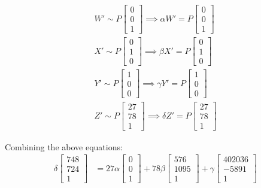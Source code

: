 \documentclass[12pt, oneside]{article}
\begin{document}
\begin{align*}
  W' \sim P
   \begin{bmatrix}
  0   \\
  0   \\
  1  
  \end{bmatrix} \implies 
  \alpha W' = P
   \begin{bmatrix}
  0   \\
  0   \\
  1  
  \end{bmatrix}   \\
  X' \sim P
   \begin{bmatrix}
  0   \\
  1   \\
  0  
  \end{bmatrix} \implies 
  \beta X' = P
   \begin{bmatrix}
  0   \\
  1   \\
  0  
  \end{bmatrix}  \\
  Y' \sim P
   \begin{bmatrix}
  1   \\
  0   \\
  0  
  \end{bmatrix} \implies 
  \gamma Y' = P
   \begin{bmatrix}
  1   \\
  0   \\
  0  
  \end{bmatrix}   \\
  Z' \sim P
   \begin{bmatrix}
  27   \\
  78   \\
  1  
  \end{bmatrix} \implies 
  \delta Z' = P
   \begin{bmatrix}
  27   \\
  78   \\
  1  
  \end{bmatrix} 
  \end{align*}
  
  Combining the above equations:
  \begin{align*}
  \delta  \begin{bmatrix}
  748   \\
  724   \\
  1  
  \end{bmatrix}  &= 27\alpha  \begin{bmatrix}
  0  \\
  0   \\
  1  
  \end{bmatrix} +
  78\beta \begin{bmatrix}
  576   \\
  1095   \\
  1  
  \end{bmatrix} + \gamma  \begin{bmatrix}
    402036  \\
    -5891 \\
    1 
\end{bmatrix}
  \end{align*} 
\end{document}
